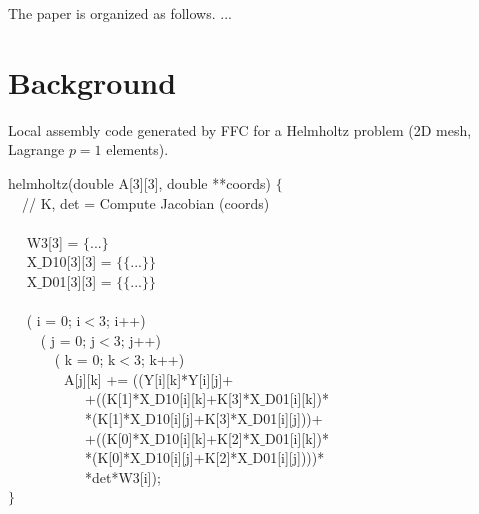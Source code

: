 \documentclass[conference]{IEEEtran}
\begin{document}
The paper is organized as follows. ...



\section{Background}
\begin{algorithm}[t]
\small
\caption{Local assembly code generated by FFC for a Helmholtz problem (2D mesh, Lagrange $p=1$ elements).}
\label{code:helmholtz}
 helmholtz(double A[3][3], double **coords) $\lbrace$\\
~~// K, det = Compute Jacobian (coords) \\
~~\\
~~ W3[3] = $\lbrace$...$\rbrace$\\
~~ X$\_$D10[3][3] = $\lbrace\lbrace$...$\rbrace\rbrace$\\
~~ X$\_$D01[3][3] = $\lbrace\lbrace$...$\rbrace\rbrace$\\
~~\\
~~ ( i = 0; i$<$3; i++) \\
~~~~ ( j = 0; j$<$3; j++) \\
~~~~~~ ( k = 0; k$<$3; k++) \\
~~~~~~~~A[j][k] += ((Y[i][k]*Y[i][j]+\\
~~~~~~~~~~~+((K[1]*X$\_$D10[i][k]+K[3]*X$\_$D01[i][k])*\\
~~~~~~~~~~~*(K[1]*X$\_$D10[i][j]+K[3]*X$\_$D01[i][j]))+\\
~~~~~~~~~~~+((K[0]*X$\_$D10[i][k]+K[2]*X$\_$D01[i][k])*\\
~~~~~~~~~~~*(K[0]*X$\_$D10[i][j]+K[2]*X$\_$D01[i][j])))*\\
~~~~~~~~~~~*det*W3[i]);\\
$\rbrace$
\end{algorithm}
\end{document}

